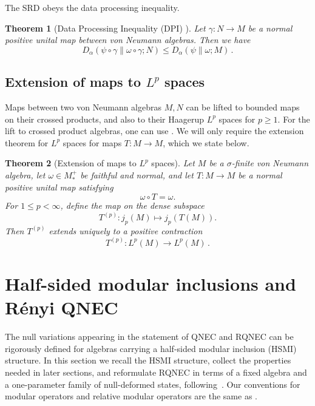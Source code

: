 \documentclass[11pt,a4paper]{article}
\theoremstyle{plain}
\newtheorem{theorem}{Theorem}
\numberwithin{theorem}{section}
\theoremstyle{definition}
\newcommand{\?}{\overset{?}{=}}
\renewcommand{\a}{\alpha}	%
\newcommand{\g}{\gamma}
\begin{document}
The SRD obeys the data processing inequality.
\begin{theorem}[Data Processing Inequality (DPI) \cite{Berta:2016vnw,Jencova:2016tqz,Jencova:2017txf}]\label{thm:DPI-range-SRD}
Let $\g:N\to M$ be a normal positive unital map between von Neumann algebras. Then we have
\begin{equation}
    D_{\a}(\psi\circ\g\|\omega\circ\g;N) \leq D_{\a}(\psi\|\omega;M)\,.
\end{equation}
\end{theorem}


\subsection{Extension of maps to \texorpdfstring{$L^p$}{Lp} spaces}\label{ssec:extension}

Maps between two von Neumann algebras $M,N$ can be lifted to bounded maps on their crossed products, and also to their Haagerup $L^p$ spaces for $p\geq1$. For the lift to crossed product algebras, one can use \cite[Theorem 4.1]{Haagerup:2008arm}. We will only require the extension theorem for $L^p$ spaces for maps $T: M \to M$, which we state below.

\begin{theorem}[Extension of maps to $L^p$ spaces]\label{thm:extension-Lp}
Let \(M\) be a \(\sigma\)-finite von Neumann algebra, let
\(\omega\in M_*^+\) be faithful and normal, and let
\(T:M\to M\) be a normal positive unital map satisfying
\[
        \omega\circ T=\omega.
\]
For \(1\leq p<\infty\), define the map on the dense subspace
\[
    T^{(p)}: j_p(M)\longmapsto j_p(T(M)).
\]
Then $T^{(p)}$ extends uniquely to a positive contraction
\[
        T^{(p)}:L^p(M)\longrightarrow L^p(M)\,.
\]
\end{theorem}

\section{Half-sided modular inclusions and R\'{e}nyi QNEC}\label{Sec:HSMI}

The null variations appearing in the statement of QNEC and RQNEC can be rigorously defined for algebras carrying a half-sided modular inclusion (HSMI) structure.  In this section we recall the HSMI structure, collect the properties needed in later sections, and reformulate RQNEC in terms of a fixed algebra and a one-parameter family of null-deformed states, following~\cite{Hollands:2025glm}.  Our conventions for modular operators and relative modular operators are the same as \cite{Hiai:2021qfv}.
 
\end{document}
